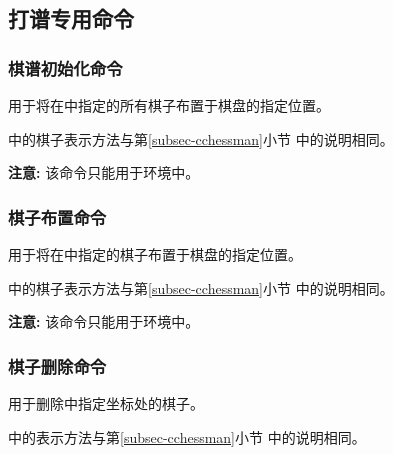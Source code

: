 \documentclass[full]{l3doc}
\begin{document}
\begin{documentation}
\subsection{打谱专用命令}

\subsubsection{棋谱初始化命令}

\begin{function}{\init}
  \begin{syntax}
     
  \end{syntax}
\end{function}

  用于将在中指定的所有棋子布置于棋盘的指定位置。

  中的棋子表示方法与第\ref{subsec-cchessman}小节
  中的说明相同。

  \textbf{\textsf{注意: }}该命令只能用于环境中。

\subsubsection{棋子布置命令}

\begin{function}{\set}
  \begin{syntax}
     
  \end{syntax}
\end{function}

  用于将在中指定的棋子布置于棋盘的指定位置。

  中的棋子表示方法与第\ref{subsec-cchessman}小节
  中的说明相同。

  \textbf{\textsf{注意: }}该命令只能用于环境中。

\subsubsection{棋子删除命令}

\begin{function}{\del}
  \begin{syntax}
     
  \end{syntax}
\end{function}

  用于删除中指定坐标处的棋子。

  中的表示方法与第\ref{subsec-cchessman}小节
  中的说明相同。


\end{documentation}
\end{document}
